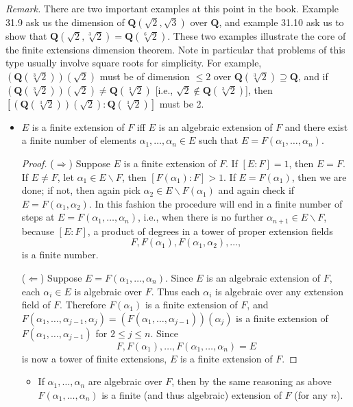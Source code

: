 \documentclass[11pt]{article}
\newcommand{\rmk}{\noindent\textit{Remark. }}
\newcommand{\Q}{\mathbf{Q}}
\renewcommand{\implies}{\Rightarrow}
\renewcommand{\impliedby}{\Leftarrow}
\begin{document}
\rmk There are two important examples at this point in the book. Example 31.9 ask us the dimension of $\Q(\sqrt{2},\sqrt{3})$ over $\Q$, and example 31.10 ask us to show that $\Q(\sqrt{2},\sqrt[3]{2}) = \Q(\sqrt[6]{2})$. These two examples illustrate the core of the finite extensions dimension theorem. Note in particular that problems of this type usually involve square roots for simplicity. For example, $(\Q(\sqrt[3]{2}))(\sqrt{2})$ must be of dimension $\leq 2$ over $\Q(\sqrt[3]{2}) \supseteq \Q$, and if $(\Q(\sqrt[3]{2}))(\sqrt{2}) \neq \Q(\sqrt[3]{2})$ [i.e., $\sqrt{2} \notin \Q(\sqrt[3]{2})$], then $[(\Q(\sqrt[3]{2}))(\sqrt{2}) : \Q(\sqrt[3]{2})]$ must be 2.
\begin{itemize}
    \item $E$ is a finite extension of $F$ iff $E$ is an algebraic extension of $F$ and there exist a finite number of elements $\alpha_1,\dots,\alpha_n \in E$ such that $E = F(\alpha_1,\dots,\alpha_n)$.
    \begin{proof}
        ($\implies$) Suppose $E$ is a finite extension of $F$. If $[E:F] = 1$, then $E = F$. If $E \neq F$, let $\alpha_1 \in E\backslash F$, then $[F(\alpha_1):F] > 1$. If $E = F(\alpha_1)$, then we are done; if not, then again pick $\alpha_2 \in E\backslash F(\alpha_1)$ and again check if $E = F(\alpha_1,\alpha_2)$. In this fashion the procedure will end in a finite number of steps at $E = F(\alpha_1,\dots,\alpha_n)$, i.e., when there is no further $\alpha_{n+1} \in E\backslash F$, because $[E:F]$, a product of degrees in a tower of proper extension fields \[F,F(\alpha_1),F(\alpha_1,\alpha_2),\dots,\] is a finite number.
        
        ($\impliedby$) Suppose $E = F(\alpha_1,\dots,\alpha_n)$. Since $E$ is an algebraic extension of $F$, each $\alpha_i \in E$ is algebraic over $F$. Thus each $\alpha_i$ is algebraic over any extension field of $F$. Therefore $F(\alpha_1)$ is a finite extension of $F$, and $F(\alpha_1,\dots,\alpha_{j-1},\alpha_j) = (F(\alpha_1,\dots,\alpha_{j-1}))(\alpha_j)$ is a finite extension of $F(\alpha_1,\dots,\alpha_{j-1})$ for $2 \leq j \leq n$. Since \[F,F(\alpha_1),\dots,F(\alpha_1,\dots,\alpha_n) = E\] is now a tower of finite extensions, $E$ is a finite extension of $F$.
    \end{proof}
        \begin{itemize}
        \item If $\alpha_1,\dots,\alpha_n$ are algebraic over $F$, then by the same reasoning as above $F(\alpha_1,\dots,\alpha_n)$ is a finite (and thus algebraic) extension of $F$ (for any $n$).
        

\end{itemize}
\end{itemize}
\end{document}
